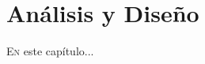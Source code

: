 \chapter{Análisis y Diseño}
\minitoc
\label{chap:diseno}
\vspace{0.5cm}


  \lettrine{E}{n} este capítulo...

